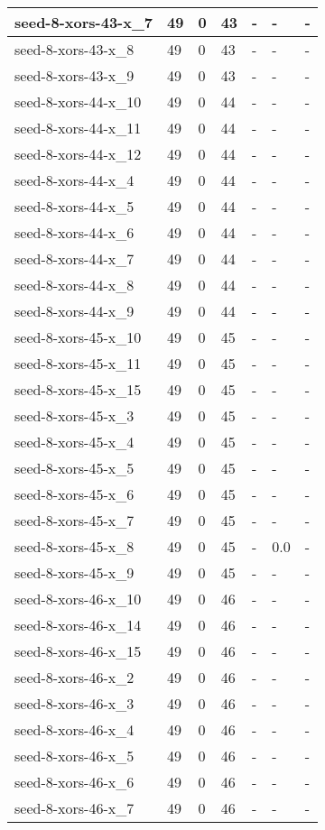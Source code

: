 \begin{scriptsize}
\begin{longtable}{|p{5cm}|l|l|l|l|l|l|}
seed-8-xors-43-x\_7&49&0&43&-&-&- \\ \hline 
seed-8-xors-43-x\_8&49&0&43&-&-&- \\ \hline 
seed-8-xors-43-x\_9&49&0&43&-&-&- \\ \hline 
seed-8-xors-44-x\_10&49&0&44&-&-&- \\ \hline 
seed-8-xors-44-x\_11&49&0&44&-&-&- \\ \hline 
seed-8-xors-44-x\_12&49&0&44&-&-&- \\ \hline 
seed-8-xors-44-x\_4&49&0&44&-&-&- \\ \hline 
seed-8-xors-44-x\_5&49&0&44&-&-&- \\ \hline 
seed-8-xors-44-x\_6&49&0&44&-&-&- \\ \hline 
seed-8-xors-44-x\_7&49&0&44&-&-&- \\ \hline 
seed-8-xors-44-x\_8&49&0&44&-&-&- \\ \hline 
seed-8-xors-44-x\_9&49&0&44&-&-&- \\ \hline 
seed-8-xors-45-x\_10&49&0&45&-&-&- \\ \hline 
seed-8-xors-45-x\_11&49&0&45&-&-&- \\ \hline 
seed-8-xors-45-x\_15&49&0&45&-&-&- \\ \hline 
seed-8-xors-45-x\_3&49&0&45&-&-&- \\ \hline 
seed-8-xors-45-x\_4&49&0&45&-&-&- \\ \hline 
seed-8-xors-45-x\_5&49&0&45&-&-&- \\ \hline 
seed-8-xors-45-x\_6&49&0&45&-&-&- \\ \hline 
seed-8-xors-45-x\_7&49&0&45&-&-&- \\ \hline 
seed-8-xors-45-x\_8&49&0&45&-&0.0&- \\ \hline 
seed-8-xors-45-x\_9&49&0&45&-&-&- \\ \hline 
seed-8-xors-46-x\_10&49&0&46&-&-&- \\ \hline 
seed-8-xors-46-x\_14&49&0&46&-&-&- \\ \hline 
seed-8-xors-46-x\_15&49&0&46&-&-&- \\ \hline 
seed-8-xors-46-x\_2&49&0&46&-&-&- \\ \hline 
seed-8-xors-46-x\_3&49&0&46&-&-&- \\ \hline 
seed-8-xors-46-x\_4&49&0&46&-&-&- \\ \hline 
seed-8-xors-46-x\_5&49&0&46&-&-&- \\ \hline 
seed-8-xors-46-x\_6&49&0&46&-&-&- \\ \hline 
seed-8-xors-46-x\_7&49&0&46&-&-&- \\ \hline 

\end{longtable}
\end{scriptsize}

